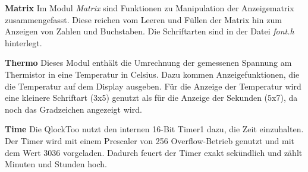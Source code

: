 \begin{multicols}{2}
\textbf{Matrix}
Im Modul \emph{Matrix} sind Funktionen zu Manipulation der Anzeigematrix zusammengefasst. Diese reichen vom Leeren und Füllen der Matrix hin zum Anzeigen von Zahlen und Buchstaben. Die Schriftarten sind in der Datei \emph{font.h} hinterlegt.

\textbf{Thermo}
Dieses Modul enthält die Umrechnung der gemessenen Spannung am Thermistor in eine Temperatur in Celsius.
Dazu kommen Anzeigefunktionen, die die Temperatur auf dem Display ausgeben.
Für die Anzeige der Temperatur wird eine kleinere Schriftart (3x5) genutzt als für die Anzeige der Sekunden (5x7), da noch das Gradzeichen angezeigt wird.

\textbf{Time}
Die QlockToo nutzt den internen 16-Bit Timer1 dazu, die Zeit einzuhalten.
Der Timer wird mit einem Prescaler von 256 Overflow-Betrieb genutzt und mit dem Wert 3036 vorgeladen.
Dadurch feuert der Timer exakt sekündlich und zählt Minuten und Stunden hoch.


\end{multicols}
